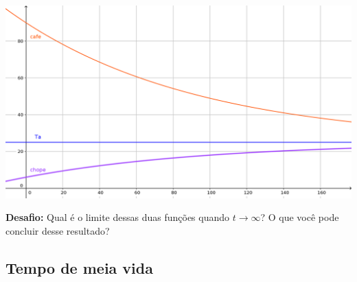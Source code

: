 \documentclass[a4paper]{article}
\begin{document}
\begin{center}
  \includegraphics[width=.9\textwidth]{cafe_chope}
\end{center}
\hrulefill

{\bf Desafio:} Qual é o limite dessas duas funções quando
$t\rightarrow \infty$? O que você pode concluir desse resultado?

\subsection{Tempo de meia vida}
\end{document}
